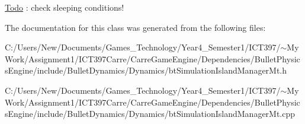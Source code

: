\begin{Desc}
\item[\hyperlink{todo__todo000036}{Todo}]: check sleeping conditions! \end{Desc}


The documentation for this class was generated from the following files:\begin{CompactItemize}
\item 
C:/Users/New/Documents/Games\_\-Technology/Year4\_\-Semester1/ICT397/$\sim$My Work/Assignment1/ICT397Carre/CarreGameEngine/Dependencies/BulletPhysicsEngine/include/BulletDynamics/Dynamics/btSimulationIslandManagerMt.h\item 
C:/Users/New/Documents/Games\_\-Technology/Year4\_\-Semester1/ICT397/$\sim$My Work/Assignment1/ICT397Carre/CarreGameEngine/Dependencies/BulletPhysicsEngine/include/BulletDynamics/Dynamics/btSimulationIslandManagerMt.cpp\end{CompactItemize}

